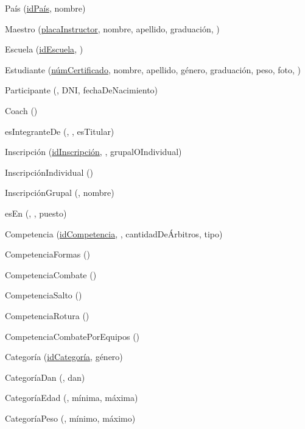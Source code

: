 \par País (\underline{idPaís}, nombre)

\par Maestro (\underline{placaInstructor}, nombre, apellido, graduación, )
\par Escuela (\underline{idEscuela}, )

\par Estudiante (\underline{númCertificado}, nombre, apellido, género, graduación, peso, foto, )
\par Participante (\underline{}, DNI, fechaDeNacimiento)
\par Coach (\underline{})

\par esIntegranteDe (\underline{}, \underline{}, esTitular)
\par Inscripción (\underline{idInscripción}, , grupalOIndividual)
\par InscripciónIndividual (\underline{})
\par InscripciónGrupal (\underline{}, nombre)

\par esEn (\underline{}, \underline{}, puesto)

\par Competencia (\underline{idCompetencia}, , cantidadDeÁrbitros, tipo)
\par CompetenciaFormas (\underline{})
\par CompetenciaCombate (\underline{})
\par CompetenciaSalto (\underline{})
\par CompetenciaRotura (\underline{})
\par CompetenciaCombatePorEquipos (\underline{})

\par Categoría (\underline{idCategoría}, género)
\par CategoríaDan (\underline{}, dan)
\par CategoríaEdad (\underline{}, mínima, máxima)
\par CategoríaPeso (\underline{}, mínimo, máximo)

